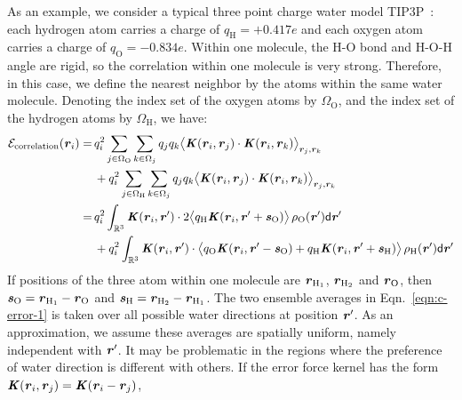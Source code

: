 \documentclass[aps,pre,preprint,unsortedaddress]{revtex4}
\renewcommand{\v}[1]{\textbf{\textit{#1}}}
\renewcommand{\d}[1]{\textsf{#1}}
\begin{document}
As an example, we consider a typical three point charge water model
TIP3P~\cite{jorgensen1983comparison}: each hydrogen atom carries a
charge of $q_{\textrm{H}} = +0.417e$ and each oxygen atom carries a
charge of $q_{\textrm{O}} = -0.834e$. Within one molecule, the H-O
bond and H-O-H angle are rigid, so the correlation within one molecule
is very strong.  Therefore, in this case, we define the nearest neighbor by the
atoms within the same water molecule.  Denoting the index set of the oxygen
atoms by $\Omega_{\textrm{O}}$, and the index set of the hydrogen
atoms by $\Omega_{\textrm{H}}$, we have:
\begin{align}\nonumber
  \mathcal E_{\textrm{correlation}}(\v r_i)
  = &\,
  q_i^2\sum_{j\in\Omega_{\textrm{O}}}\sum_{k\in\Omega_j}q_jq_k
  \big\langle
  \v K(\v r_i , \v r_j)\cdot\v K(\v r_i , \v r_k)
  \big\rangle_{\v r_j,\v r_k} \\ \nonumber
  &\,+ 
  q_i^2\sum_{j\in\Omega_{\textrm{H}}}\sum_{k\in\Omega_j}q_jq_k
  \big\langle
  \v K(\v r_i , \v r_j)\cdot\v K(\v r_i , \v r_k)
  \big\rangle_{\v r_j,\v r_k} \\\nonumber
  = &\,
  q_i^2
  \int_{\mathbb R^3}
  \v K(\v r_i , \v r')\cdot
  2\big\langle
  q_{\textrm{H}}\v K(\v r_i , \v r' + \v s_{\textrm{O}})
  \big\rangle\,
  \rho_{\textrm{O}}(\v r')
  \d d\v r' \\\label{eqn:c-error-1}
  & \,+
  q_i^2
  \int_{\mathbb R^3}
  \v K(\v r_i , \v r')\cdot
  \big\langle
  q_{\textrm{O}}\v K(\v r_i , \v r' - \v s_{\textrm{O}})+
  q_{\textrm{H}}\v K(\v r_i , \v r' + \v s_{\textrm{H}})
  \big\rangle\,\rho_{\textrm{H}}(\v r')
  \d d\v r'
\end{align}
If positions of the three atom within one molecule are
$\v r_{\textrm{H}_1}$, $\v r_{\textrm{H}_2}$ and $\v r_{\textrm{O}}$, then
$\v s_{\textrm{O}} = \v r_{\textrm{H}_1} - \v r_{\textrm{O}}$ and
$\v s_{\textrm{H}} = \v r_{\textrm{H}_2} - \v r_{\textrm{H}_1}$.
The two ensemble averages in Eqn.~\eqref{eqn:c-error-1}
is taken over all possible water directions 
at position $\v r'$. As an approximation, we
assume these averages are  spatially uniform, namely independent with $\v r'$.
It may be  problematic
in the regions where the preference of water  direction is different
with others.
If the error force kernel
has the form $\v K(\v r_i , \v r_j) = \v K(\v r_i - \v r_j)$, 
\end{document}
